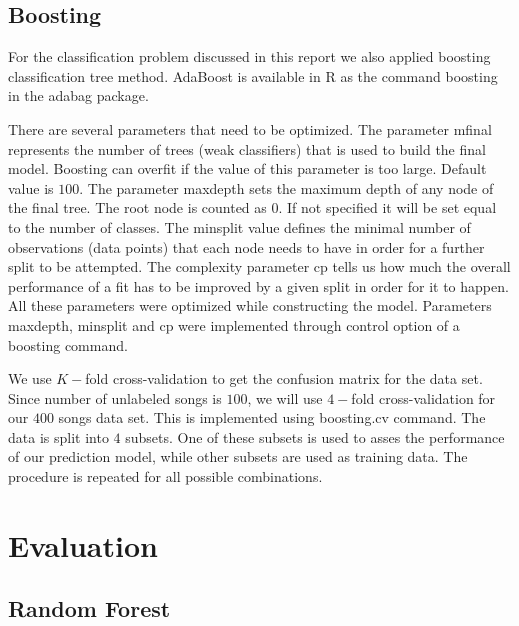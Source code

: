 \documentclass{article}
\begin{document}
\subsection{Boosting}

For the classification problem discussed in this report we also applied boosting classification tree method. AdaBoost is available in R as the command {\selectfont boosting} in the {\selectfont adabag} package.

There are several parameters that need to be optimized. The parameter {\selectfont mfinal} represents the number of trees (weak classifiers) that is used to build the final model. Boosting can overfit if the value of this parameter is too large. Default value is $100$. The parameter {\selectfont maxdepth} sets the maximum depth of any node of the final tree. The root node is counted as $0$. If not specified it will be set equal to the number of classes. The {\selectfont minsplit} value defines the minimal number of observations (data points) that each node needs to have in order for a further split to be attempted. The complexity parameter {\selectfont cp} tells us how much the overall performance of a fit has to be improved by a given split in order for it to happen. All these parameters were optimized while constructing the model. Parameters {\selectfont maxdepth}, {\selectfont minsplit} and {\selectfont cp} were implemented through {\selectfont control} option of a {\selectfont boosting} command.

We use $K-$fold cross-validation to get the confusion matrix for the data set. Since number of unlabeled songs is $100$, we will use $4-$fold cross-validation for our $400$ songs data set. This is implemented using {\selectfont boosting.cv} command. The data is split into $4$ subsets. One of these subsets is used to asses the performance of our prediction model, while other subsets are used as training data. The procedure is repeated for all possible combinations.

\section{Evaluation}

\subsection{Random Forest}
\end{document}
